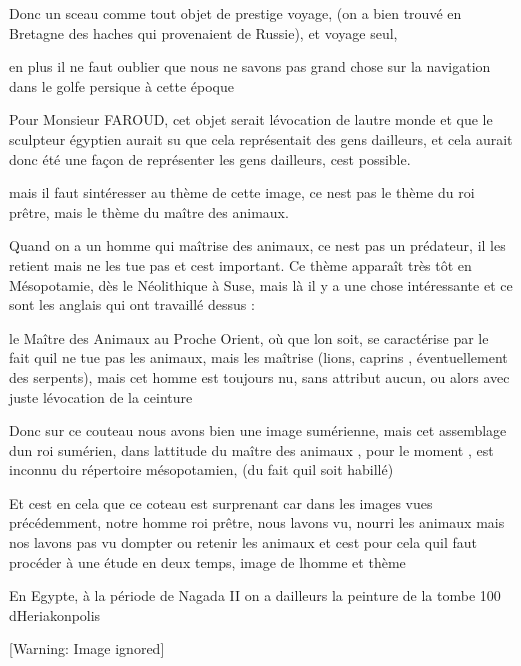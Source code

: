 \documentclass{article}
\begin{document}
Donc un sceau comme tout objet de prestige voyage, (on a bien trouvé en
Bretagne des haches qui provenaient de Russie), et voyage seul, 

en plus il ne faut oublier que nous ne savons pas grand chose sur la
navigation dans le golfe persique à cette époque

Pour Monsieur FAROUD, cet objet serait l{\textquotesingle}évocation de
l{\textquotesingle}autre monde et que le sculpteur égyptien aurait su
que cela représentait des gens d{\textquotesingle}ailleurs,  et cela
aurait donc été une façon de représenter les gens
d{\textquotesingle}ailleurs, c{\textquotesingle}est possible.

mais il faut s{\textquotesingle}intéresser au thème de cette image, ce
n{\textquotesingle}est pas le thème du roi prêtre, mais le thème du
maître des animaux.

Quand on a un homme qui maîtrise des animaux, ce n{\textquotesingle}est
pas un prédateur, il les retient mais ne les tue pas et
c{\textquotesingle}est important. Ce thème apparaît très tôt en
Mésopotamie, dès le Néolithique à Suse, mais là il y a une chose
intéressante et ce sont les anglais qui ont travaillé dessus : 

le Maître des Animaux au Proche Orient, où que l{\textquotesingle}on
soit, se caractérise par le fait qu{\textquotesingle}il ne tue pas les
animaux,  mais les maîtrise (lions, caprins , éventuellement des
serpents), mais cet homme est toujours nu, sans attribut aucun, ou
alors avec juste l{\textquotesingle}évocation de la ceinture 

Donc sur ce couteau nous avons bien une image sumérienne, mais cet
assemblage d{\textquotesingle}un roi sumérien, dans
l{\textquotesingle}attitude du maître des animaux , pour le moment ,
est inconnu du répertoire mésopotamien, (du fait qu{\textquotesingle}il
soit habillé)

Et c{\textquotesingle}est en cela que ce coteau est surprenant car dans
les images vues précédemment, notre homme roi prêtre, nous
l{\textquotesingle}avons vu, nourri les animaux mais nos
l{\textquotesingle}avons pas vu dompter ou retenir les animaux  et
c{\textquotesingle}est pour cela qu{\textquotesingle}il faut procéder à
une étude en deux temps, image de l{\textquotesingle}homme et thème

En Egypte, à la période de Nagada II on a d{\textquotesingle}ailleurs la
peinture de la tombe 100 d{\textquotesingle}Heriakonpolis

  [Warning: Image ignored] %
 
\end{document}

